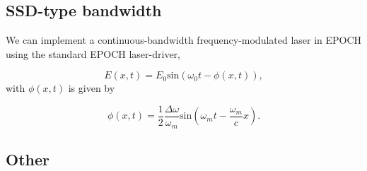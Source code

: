 \subsection{SSD-type bandwidth}
We can implement a continuous-bandwidth frequency-modulated laser in EPOCH using the standard EPOCH laser-driver,

\begin{equation}
 	 E(x,t) = E_0\text{sin}\left(\omega_0 t - \phi(x,t)\right),
\end{equation} with $\phi(x,t)$ is given by

\begin{equation}
	\phi(x,t) = \frac{1}{2}\frac{\Delta\omega}{\omega_m}\text{sin}	 	 \left(\omega_mt - \frac{\omega_m}{c}x\right).
\end{equation}
\subsection{Other}

